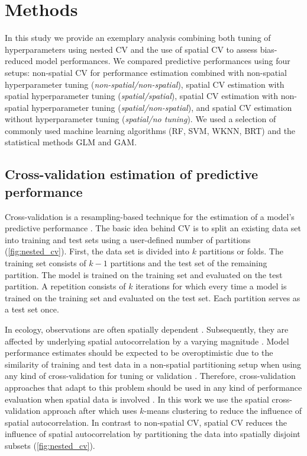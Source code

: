 \documentclass[review]{elsarticle}
\begin{document}
\section{Methods}

In this study we provide an exemplary analysis combining both tuning of hyperparameters using nested \ac{CV} and the use of spatial \ac{CV} to assess bias-reduced model performances.
We compared predictive performances using four setups: non-spatial \ac{CV} for performance estimation combined with non-spatial hyperparameter tuning (\emph{non-spatial/non-spatial}), spatial \ac{CV} estimation with spatial hyperparameter tuning (\emph{spatial/spatial}), spatial \ac{CV} estimation with non-spatial hyperparameter tuning (\emph{spatial/non-spatial}), and spatial \ac{CV} estimation without hyperparameter tuning (\emph{spatial/no tuning}).
We used a selection of commonly used machine learning algorithms (\ac{RF}, \ac{SVM}, \ac{WKNN}, \ac{BRT}) and the statistical methods \ac{GLM} and \ac{GAM}.

\subsection{Cross-validation estimation of predictive performance}
\label{sec:nested_cv}

Cross-validation is a resampling-based technique for the estimation of a model's predictive performance \citep{James2013}.
The basic idea behind \ac{CV} is to split an existing data set into training and test sets using a user-defined number of partitions (\autoref{fig:nested_cv}).
First, the data set is divided into $k$ partitions or folds.
The training set consists of $k - 1$ partitions and the test set of the remaining partition.
The model is trained on the training set and evaluated on the test partition.
A repetition consists of $k$ iterations for which every time a model is trained on the training set and evaluated on the test set.
Each partition serves as a test set once.

In ecology, observations are often spatially dependent \citep{Dormann2007, Legendre1989}.
Subsequently, they are affected by underlying spatial autocorrelation by a varying magnitude \citep{Brenning2005, Telford2005}.
Model performance estimates should be expected to be overoptimistic due to the similarity of training and test data in a non-spatial partitioning setup when using any kind of cross-validation for tuning or validation \citep{sperrorest}.
Therefore, cross-validation approaches that adapt to this problem should be used in any kind of performance evaluation when spatial data is involved \citep{sperrorest, Meyer2018, Telford2009}.
In this work we use the spatial cross-validation approach after \cite{sperrorest} which uses $k$-means clustering to reduce the influence of spatial autocorrelation.
In contrast to non-spatial CV, spatial CV reduces the influence of spatial autocorrelation by partitioning the data into spatially disjoint subsets (\autoref{fig:nested_cv}).
\end{document}
